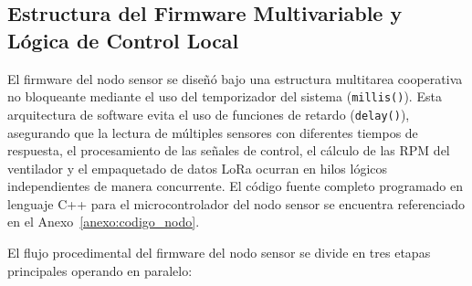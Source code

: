 \subsection{Estructura del Firmware Multivariable y Lógica de Control Local}

El firmware del nodo sensor se diseñó bajo una estructura multitarea cooperativa no bloqueante mediante el uso del temporizador del sistema (\texttt{millis()}). Esta arquitectura de software evita el uso de funciones de retardo (\texttt{delay()}), asegurando que la lectura de múltiples sensores con diferentes tiempos de respuesta, el procesamiento de las señales de control, el cálculo de las RPM del ventilador y el empaquetado de datos LoRa ocurran en hilos lógicos independientes de manera concurrente. El código fuente completo programado en lenguaje C++ para el microcontrolador del nodo sensor se encuentra referenciado en el Anexo~\ref{anexo:codigo_nodo}.

El flujo procedimental del firmware del nodo sensor se divide en tres etapas principales operando en paralelo:

